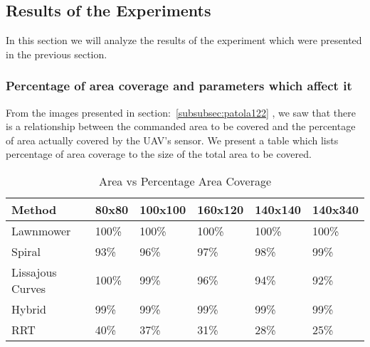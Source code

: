 



\newpage
\subsection{Results of the Experiments}
\label{subsec:hujani}
In this section we will analyze the results of the experiment which were presented in the previous section.

\subsubsection{Percentage of area coverage and parameters which affect it}

From the images presented in section:~\ref{subsubsec:patola122} , we saw that there is a relationship between the commanded area to be covered and the percentage of area actually covered by the UAV's sensor. We present a table which lists percentage of area coverage to the size of the total area to be covered.
\begin{table}[htbp]
\centering
\caption{Area vs Percentage Area Coverage}
\label{tab2swer}
\begin{tabular}{|l|l|l|l|l|l|}
																	\\ \hline
Method           & 80x80    & 100x100    & 160x120  & 140x140  & 140x340  \\ \hline
Lawnmower        & 100\% & 100\% & 100\% & 100\% & 100\% \\ \hline
Spiral           & 93\%  & 96\%  & 97\%  & 98\%  & 99\%  \\ \hline
Lissajous Curves & 100\% & 99\%  & 96\%  & 94\%  & 92\%  \\ \hline
Hybrid           & 99\%  & 99\%  & 99\%  & 99\%  & 99\%  \\ \hline
RRT              & 40\%  & 37\%  & 31\%  & 28\%  & 25\%  \\ \hline
\end{tabular}
\end{table}

